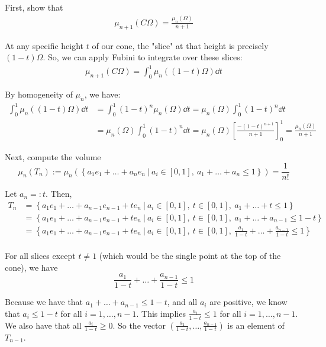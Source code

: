 \documentclass[12pt]{article}
\begin{document}
First, show that 
$$
\begin{aligned}
    \mu_{n+1}(C\Omega) = \frac{\mu_n(\Omega)}{n + 1}
\end{aligned}
$$

At any specific height $t$ of our cone, the "slice" at that height is precisely $(1-t)\Omega$. So, we can apply Fubini to integrate over these slices:
$$
\begin{aligned}
    \mu_{n+1}(C\Omega) = \int_{0}^{1} \mu_n((1-t)\Omega) \dd t
\end{aligned}
$$

By homogeneity of $\mu_n$, we have:
$$
\begin{aligned}
    \int_{0}^{1} \mu_n((1-t)\Omega) \dd t &= \int_{0}^{1} (1-t)^n \mu_n(\Omega) \dd t = \mu_n(\Omega) \int_{0}^{1} (1-t)^n \dd t \\
    &= \mu_n(\Omega) \int_{0}^{1} (1-t)^n \dd t = \mu_n(\Omega) \left[ \frac{-(1-t)^{n+1}}{n + 1} \right]_0^1 = \boxed{\frac{\mu_n(\Omega)}{n + 1}}
\end{aligned}
$$

Next, compute the volume
$$
    \mu_n(T_n) := \mu_n\left( \left\{ a_1e_1 + \dots + a_ne_n \ |\ a_i \in [0, 1],\ a_1 + \dots + a_n \leq 1 \right\} \right) = \frac{1}{n!}
$$

Let $a_n =: t$. Then,
$$
\begin{aligned}
    T_n &= \left\{ a_1e_1 + \dots + a_{n-1}e_{n-1} + te_n \ |\ a_i \in [0, 1],\ t \in [0, 1],\ a_1 + \dots + t \leq 1 \right\} \\
    &= \left\{ a_1e_1 + \dots + a_{n-1}e_{n-1} + te_n \ |\ a_i \in [0, 1],\ t \in [0, 1],\ a_1 + \dots + a_{n-1} \leq 1 - t \right\} \\
    &= \left\{ a_1e_1 + \dots + a_{n-1}e_{n-1} + te_n \ |\ a_i \in [0, 1],\ t \in [0, 1],\ \frac{a_1}{1 - t} + \dots + \frac{a_{n-1}}{1 - t} \leq 1 \right\} \\
\end{aligned}
$$

For all slices except $t \neq 1$ (which would be the single point at the top of the cone), we have
$$
    \frac{a_1}{1 - t} + \dots + \frac{a_{n-1}}{1 - t} \leq 1
$$

Because we have that $a_1 + \dots + a_{n-1} \leq 1 - t$, and all $a_i$ are positive, we know that $a_i \leq 1 -t$ for all $i = 1,\dots,n-1$. This implies $\frac{a_i}{1 - t} \leq 1$ for all $i = 1,\dots,n-1$. We also have that all $\frac{a_i}{1-t} \geq 0$. So the vector $(\frac{a_1}{1 - t}, \dots, \frac{a_{n-1}}{1 - t})$ is an element of $T_{n-1}$.
\end{document}
